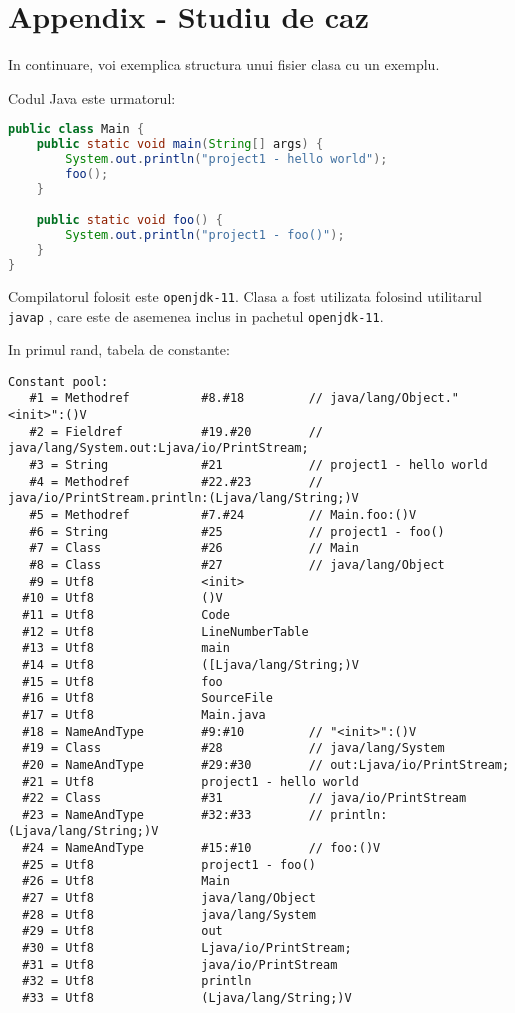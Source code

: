 \section{Appendix - Studiu de caz}

In continuare, voi exemplica structura unui fisier clasa cu un exemplu.

Codul Java este urmatorul:

\begin{lstlisting}[language=Java]
public class Main {
    public static void main(String[] args) {
        System.out.println("project1 - hello world");
        foo();
    }

    public static void foo() {
        System.out.println("project1 - foo()");
    }
}
\end{lstlisting}

Compilatorul folosit este \texttt{openjdk-11}. Clasa a fost utilizata
folosind utilitarul \texttt{javap} \cite{javap}, care este de asemenea inclus
in pachetul \texttt{openjdk-11}.

In primul rand, tabela de constante:

\begin{lstlisting}
Constant pool:
   #1 = Methodref          #8.#18         // java/lang/Object."<init>":()V
   #2 = Fieldref           #19.#20        // java/lang/System.out:Ljava/io/PrintStream;
   #3 = String             #21            // project1 - hello world
   #4 = Methodref          #22.#23        // java/io/PrintStream.println:(Ljava/lang/String;)V
   #5 = Methodref          #7.#24         // Main.foo:()V
   #6 = String             #25            // project1 - foo()
   #7 = Class              #26            // Main
   #8 = Class              #27            // java/lang/Object
   #9 = Utf8               <init>
  #10 = Utf8               ()V
  #11 = Utf8               Code
  #12 = Utf8               LineNumberTable
  #13 = Utf8               main
  #14 = Utf8               ([Ljava/lang/String;)V
  #15 = Utf8               foo
  #16 = Utf8               SourceFile
  #17 = Utf8               Main.java
  #18 = NameAndType        #9:#10         // "<init>":()V
  #19 = Class              #28            // java/lang/System
  #20 = NameAndType        #29:#30        // out:Ljava/io/PrintStream;
  #21 = Utf8               project1 - hello world
  #22 = Class              #31            // java/io/PrintStream
  #23 = NameAndType        #32:#33        // println:(Ljava/lang/String;)V
  #24 = NameAndType        #15:#10        // foo:()V
  #25 = Utf8               project1 - foo()
  #26 = Utf8               Main
  #27 = Utf8               java/lang/Object
  #28 = Utf8               java/lang/System
  #29 = Utf8               out
  #30 = Utf8               Ljava/io/PrintStream;
  #31 = Utf8               java/io/PrintStream
  #32 = Utf8               println
  #33 = Utf8               (Ljava/lang/String;)V
\end{lstlisting}

